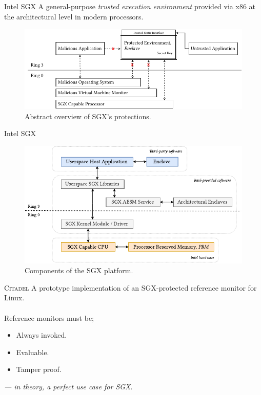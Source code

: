 \documentclass[xcolor=dvipsnames]{beamer}
\begin{document}
\begin{frame}{Intel SGX}
    A general-purpose \textit{trusted execution environment} provided via x86 at the architectural level in modern processors.
    \vspace{5mm}
    \begin{figure}[]
        \centering
        \includegraphics[width=0.99\linewidth]{../figures/SGX-architecture.pdf}
        \vspace{5mm}
        \caption{Abstract overview of SGX's protections.}
        \label{fig:citadel-overview}
    \end{figure}
\end{frame}


\begin{frame}{Intel SGX}
    \begin{figure}[]
        \centering
        \includegraphics[width=0.99\linewidth]{../figures/SGX-AdvArchitecture.pdf}
        \vspace{5mm}
        \caption{Components of the SGX platform.}
        \label{fig:citadel-overview}
    \end{figure}
\end{frame}

\begin{frame}{\textsc{Citadel}}
    A prototype implementation of an SGX-protected reference monitor for Linux. \\ \\
    Reference monitors must be;
    \begin{itemize}
        \item Always invoked.
        \item Evaluable.
        \item Tamper proof.
    \end{itemize}
    \vspace{5mm}
    \textit{---  in theory, a perfect use case for SGX}.
\end{frame}
\end{document}
